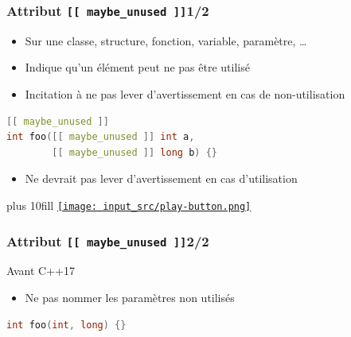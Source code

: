 \documentclass[C++.tex]{subfiles}
\begin{document}
\begin{frame}[fragile]
	\frametitle{Attribut \lstinline|[[ maybe_unused ]]|\titlehfill{}1/2}
	\begin{itemize}
		\item Sur une classe, structure, fonction, variable, paramètre, \ldots
		\item Indique qu'un élément peut ne pas être utilisé
		\item Incitation à ne pas lever d'avertissement en cas de non-utilisation
	\end{itemize}

	\begin{lstlisting}[language=C++]
[[ maybe_unused ]]
int foo([[ maybe_unused ]] int a,
        [[ maybe_unused ]] long b) {}\end{lstlisting}

	\begin{itemize}
		\item Ne devrait pas lever d'avertissement en cas d'utilisation
	\end{itemize}

	\vskip 10mm plus 10fill
	\hfill
	\href{https://godbolt.org/#g:!((g:!((g:!((h:codeEditor,i:(filename:'1',fontScale:14,fontUsePx:'0',j:1,lang:c%2B%2B,selection:(endColumn:6,endLineNumber:3,positionColumn:6,positionLineNumber:3,selectionStartColumn:6,selectionStartLineNumber:3,startColumn:6,startLineNumber:3),source:'%23include+%3Ciostream%3E%0A%0A%23if+0%0A%5B%5B+maybe_unused+%5D%5D+static+int+foo(%5B%5B+maybe_unused+%5D%5Dint+a,%0A++++++++++++++++++++++++++++++++++%5B%5B+maybe_unused+%5D%5D+int+b)%0A%23else%0Astatic+int+foo(int+a,%0A+++++++++++++++int+b)%0A%23endif%0A%7B%0A++return+0%3B%0A%7D%0A%0Aint+main()%0A%7B%0A%0A%7D%0A'),l:'5',n:'0',o:'C%2B%2B+source+%231',t:'0')),k:50,l:'4',n:'0',o:'',s:0,t:'0'),(g:!((h:executor,i:(argsPanelShown:'1',compilationPanelShown:'0',compiler:g112,compilerOutShown:'0',execArgs:'',execStdin:'',fontScale:14,fontUsePx:'0',j:1,lang:c%2B%2B,libs:!((name:boost,ver:'175')),options:'-std%3Dc%2B%2B17+-Wall+-Wextra',source:1,stdinPanelShown:'1',tree:'1',wrap:'0'),l:'5',n:'0',o:'Executor+x86-64+gcc+11.2+(C%2B%2B,+Editor+%231)',t:'0')),header:(),k:50,l:'4',n:'0',o:'',s:0,t:'0')),l:'2',n:'0',o:'',t:'0')),version:4}{\texttt{[image: input\_src/play-button.png]}}
\end{frame}

\begin{frame}[fragile]
	\frametitle{Attribut \lstinline|[[ maybe_unused ]]|\titlehfill{}2/2}
	\begin{block}{Avant C++17}
		\begin{itemize}
			\item Ne pas nommer les paramètres non utilisés
		\end{itemize}
	
		\begin{lstlisting}[language=C++]
int foo(int, long) {}\end{lstlisting}

	\end{block}
\end{frame}
\end{document}
